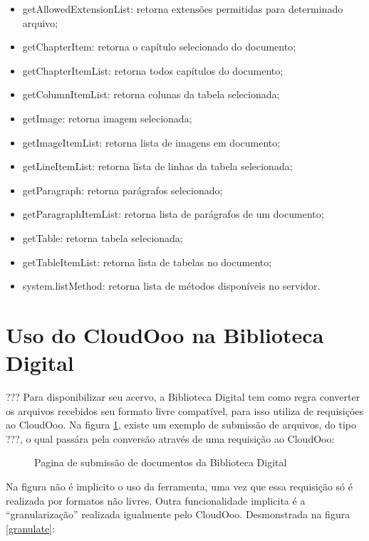 \begin{itemize}
    \item{getAllowedExtensionList: retorna extensões permitidas para determinado arquivo;}
    \item{getChapterItem: retorna o capítulo selecionado do documento;}
    \item{getChapterItemList: retorna todos capítulos do documento;}
    \item{getColumnItemList: retorna colunas da tabela selecionada;}
    \item{getImage: retorna imagem selecionada;}
    \item{getImageItemList: retorna lista de imagens em documento;}
    \item{getLineItemList: retorna lista de linhas da tabela selecionada;}
    \item{getParagraph: retorna parágrafos selecionado;}
    \item{getParagraphItemList: retorna lista de parágrafos de um documento;}
    \item{getTable: retorna tabela selecionada;}
    \item{getTableItemList: retorna lista de tabelas no documento;}
    \item{system.listMethod: retorna lista de métodos disponíveis no servidor.}
\end{itemize}

\section{Uso do CloudOoo na Biblioteca Digital}
???
Para disponibilizar seu acervo, a Biblioteca Digital tem como regra converter os arquivos recebidos seu formato livre compatível, para isso utiliza de requisições ao CloudOoo. Na figura \ref{submeter-bd}, existe um exemplo de submissão de arquivos, do tipo ???, o qual passára pela conversão através de uma requisição ao CloudOoo:

\begin{figure}[ht]
    \centering
    \caption{Pagina de submissão de documentos da Biblioteca Digital}
    \label{submeter-bd}
\end{figure}

Na figura não é implicito o uso da ferramenta, uma vez que essa requisição só é realizada por formatos não livres. Outra funcionalidade implicita é a ``granularização'' realizada igualmente pelo CloudOoo. Desmonstrada na figura \ref{granulate}:

